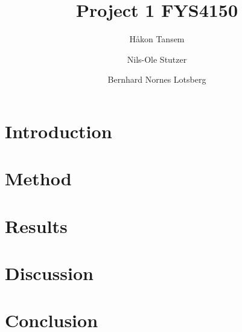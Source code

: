 \documentclass{aastex62}
\begin{document}
\title{Project 1 FYS4150}




\author[0000-0002-0786-7307]{Håkon Tansem}

\author[0000-0002-0786-7307]{Nils-Ole Stutzer}

\author[0000-0002-0786-7307]{Bernhard Nornes Lotsberg}

\begin{abstract}

\end{abstract}

\section{Introduction} \label{sec:intro}

\section{Method} \label{sec:method}

\section{Results} \label{sec:results}

\section{Discussion} \label{sec:discussion}

\section{Conclusion} \label{sec:conclusion}

\
\begin{thebibliography}{}
\end{thebibliography}
\end{document}
